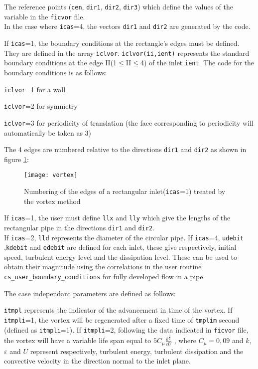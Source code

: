 {{{\begin{list}{-}{}
The reference points (\texttt{cen}, \texttt{dir1}, \texttt{dir2}, \texttt{dir3})
which define the values of the variable in the \texttt{ficvor} file.\\
In the case where \texttt{icas}=4, the vectors \texttt{dir1} and \texttt{dir2}
are generated by the code.

If \texttt{icas}=1, the boundary conditions at the rectangle's edges must be
defined. They are defined in the array
\texttt{iclvor}. \texttt{iclvor(ii,ient)} represents the standard boundary
conditions at the edge II(1$\leqslant$II$\leqslant$4) of the inlet
\texttt{ient}. The code for the boundary conditions is as follows:
\begin{list}{*}{}
\item \texttt{iclvor}=1 for a wall
\item \texttt{iclvor}=2 for symmetry
\item \texttt{iclvor}=3 for periodicity of translation (the face corresponding
      to periodicity will automatically be taken as 3)
\end{list}
The 4 edges are numbered relative to the directions \texttt{dir1} and
\texttt{dir2} as shown in figure \ref{Fig_vortex}:

\begin{figure}[!ht]
\centerline{
\texttt{[image: vortex]}}
\caption{Numbering of the edges of a rectangular inlet(\texttt{icas}=1)
 treated by the vortex method}\label{Fig_vortex}
\end{figure}

If \texttt{icas}=1, the user must define \texttt{llx} and \texttt{lly} which give
the lengths of the rectangular pipe in the directions \texttt{dir1} and \texttt{dir2}.\\
If \texttt{icas}=2, \texttt{lld} represents the diameter of the circular pipe.
If \texttt{icas}=4, \texttt{udebit} ,\texttt{kdebit} and \texttt{edebit} are
defined for each inlet, these give respectively,
initial speed, turbulent energy level and the dissipation level. These can be used to
 obtain their magnitude using the correlations in the user routine \texttt{cs\_user\_boundary\_conditions} for
 fully developed flow in a pipe.

 The case independant parameters are defined as follows:
\begin{list}{*}{}
\item \texttt{itmpl} represents the indicator of the advancement in time of the
  vortex. If \texttt{itmpli}=1, the vortex will be regenerated after a fixed
  time of
  \texttt{tmplim} second (defined as \texttt{itmpli}=1).
  If \texttt{itmpli}=2, following the data indicated in \texttt{ficvor} file,
  the vortex will have a variable life span equal to
  $5 \displaystyle C_\mu \displaystyle \frac{k^{\frac{3}{2}}}{\varepsilon U}$ ,
  where $C_\mu=0,09$ and $k$, $\varepsilon$ and $U$  represent respectively, turbulent energy,
  turbulent dissipation and the convective velocity in the direction normal to the inlet plane.


\end{list}
\end{list}}}}
